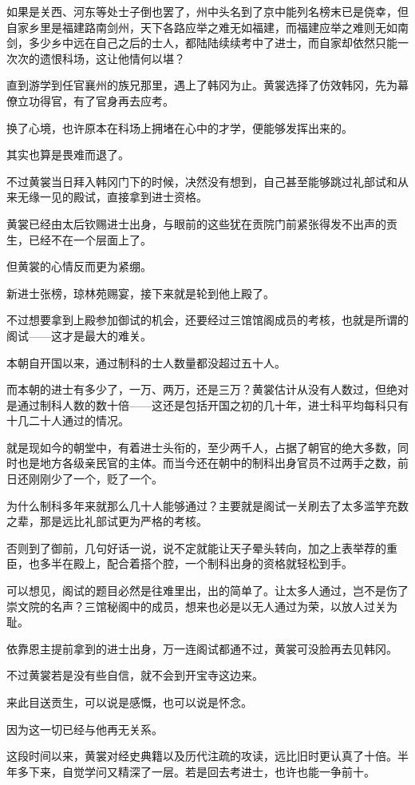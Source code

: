 如果是关西、河东等处士子倒也罢了，州中头名到了京中能列名榜末已是侥幸，但自家乡里是福建路南剑州，天下各路应举之难无如福建，而福建应举之难则无如南剑，多少乡中远在自己之后的士人，都陆陆续续考中了进士，而自家却依然只能一次次的遗恨科场，这让他情何以堪？

直到游学到任官襄州的族兄那里，遇上了韩冈为止。黄裳选择了仿效韩冈，先为幕僚立功得官，有了官身再去应考。

换了心境，也许原本在科场上拥堵在心中的才学，便能够发挥出来的。

其实也算是畏难而退了。

不过黄裳当日拜入韩冈门下的时候，决然没有想到，自己甚至能够跳过礼部试和从来无缘一见的殿试，直接拿到进士资格。

黄裳已经由太后钦赐进士出身，与眼前的这些犹在贡院门前紧张得发不出声的贡生，已经不在一个层面上了。

但黄裳的心情反而更为紧绷。

新进士张榜，琼林苑赐宴，接下来就是轮到他上殿了。

不过想要拿到上殿参加御试的机会，还要经过三馆馆阁成员的考核，也就是所谓的阁试——这才是最大的难关。

本朝自开国以来，通过制科的士人数量都没超过五十人。

而本朝的进士有多少了，一万、两万，还是三万？黄裳估计从没有人数过，但绝对是通过制科人数的数十倍——这还是包括开国之初的几十年，进士科平均每科只有十几二十人通过的情况。

就是现如今的朝堂中，有着进士头衔的，至少两千人，占据了朝官的绝大多数，同时也是地方各级亲民官的主体。而当今还在朝中的制科出身官员不过两手之数，前日还刚刚少了一个，贬了一个。

为什么制科多年来就那么几十人能够通过？主要就是阁试一关刷去了太多滥竽充数之辈，那是远比礼部试更为严格的考核。

否则到了御前，几句好话一说，说不定就能让天子晕头转向，加之上表举荐的重臣，也多半在殿上，配合着搭个腔，一个制科出身的资格就轻松到手。

可以想见，阁试的题目必然是往难里出，出的简单了。让太多人通过，岂不是伤了崇文院的名声？三馆秘阁中的成员，想来也必是以无人通过为荣，以放人过关为耻。

依靠恩主提前拿到的进士出身，万一连阁试都通不过，黄裳可没脸再去见韩冈。

不过黄裳若是没有些自信，就不会到开宝寺这边来。

来此目送贡生，可以说是感慨，也可以说是怀念。

因为这一切已经与他再无关系。

这段时间以来，黄裳对经史典籍以及历代注疏的攻读，远比旧时更认真了十倍。半年多下来，自觉学问又精深了一层。若是回去考进士，也许也能一争前十。


